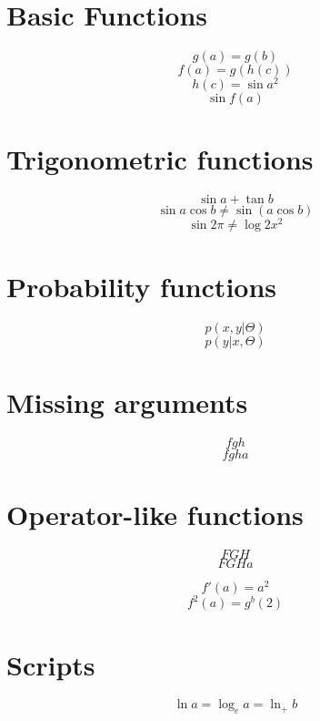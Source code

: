 \documentclass{article}
\begin{document}
\section{Basic Functions}
\[ g(a) = g(b) \]
\[ f(a) = g(h(c)) \]
\[ h(c) = \sin a^2 \]
\[ \sin f(a) \]

\section{Trigonometric functions}
\[ \sin a + \tan b \]
\[ \sin a \cos b \neq \sin(a\cos b)\]
\[ \sin 2\pi \neq \log 2x^2 \]

\section{Probability functions}
\[ p (x,y|\Theta) \]
\[ p (y |x,\Theta) \]

\section{Missing arguments}
\[ f g h \]
\[ f g h a \]
\section{Operator-like functions}
\[ F G H \]
\[ F G H a \]

\[ f'(a) = a^2 \]
\[ f^2(a) = g^b(2) \]

\section{Scripts}
\[ \ln a = \log_e a = \ln_{+} b\]
\end{document}
